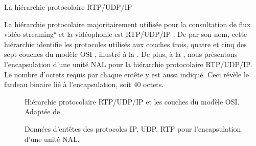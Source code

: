 \begin{section}{La hiérarchie protocolaire RTP/UDP/IP}
\label{sect-RTP}

La hiérarchie protocolaire majoritairement utilisée pour la consultation de flux
vidéo \ang{streaming} et la vidéophonie est RTP/UDP/IP \citep{Wenger2003}. De
par son nom, cette hiérarchie identifie les protocoles utilisés aux couches
trois, quatre et cinq des sept couches du modèle OSI \citep{Zimmermann1980},
illustré à la . De plus, à la , nous
présentons l'encapsulation d'une unité NAL pour la hiérarchie protocolaire
RTP/UDP/IP. Le nombre d'octets requis par chaque entête y est aussi indiqué.
Ceci révèle le fardeau binaire lié à l'encapsulation, soit 40 octets.

\begin{figure}
	 \caption[Hiérarchie protocolaire RTP/UDP/IP et le modèle OSI]{Hiérarchie
protocolaire RTP/UDP/IP et les couches du modèle OSI. \\Adaptée de
\citet[p.~339]{Smith2006}}
	\label{fig-OSI_Layers}
\end{figure}

\begin{figure}
	 \caption[Entêtes IP, UDP, RTP pour l'encapsulation d'une unité NAL]{Données
d'entêtes des protocoles IP, UDP, RTP pour l'encapsulation d'une unité NAL.}
	\label{fig-IPUDPRTP}
\end{figure}


\end{section}
